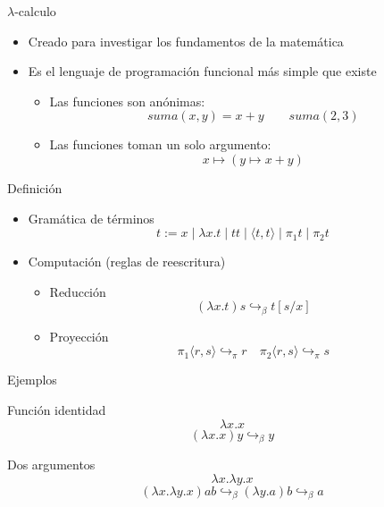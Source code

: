 \begin{frame}{$\lambda$-calculo}
	\begin{itemize}[<+->]
		\item Creado para investigar los fundamentos de la matemática
		\item Es el lenguaje de programación funcional más simple que existe
		\begin{itemize}[<+->]
			\item Las funciones son anónimas:
			\[ suma(x, y)= x + y \quad\quad suma(2, 3) \]
			\uncover<+->{
				\[ ((x, y) \mapsto x + y)(2, 3) \]
			}
			
			\item Las funciones toman un solo argumento:
			\[ x \mapsto (y \mapsto x + y) \]
			\uncover<+->{
				\[ (x \mapsto (y \mapsto x + y))\; 2 \Rightarrow y \mapsto 2 + y \]
			}
		\end{itemize}
	\end{itemize}
\end{frame}

\begin{frame}{Definición}
	\begin{itemize}[<+->]
		\item Gramática de términos
		\[ t := x \mid \lambda x.t \mid t t \mid \langle t, t \rangle \mid \pi_1 t \mid \pi_2 t \]
		
		\item Computación (reglas de reescritura)
			\begin{itemize}[<+->]
				\item Reducción
				\[ (\lambda x.t) s \hookrightarrow_\beta t[s/x] \]
				
				\item Proyección
				\[ \pi_1 \langle r, s \rangle \hookrightarrow_\pi r \quad \pi_2 \langle r, s \rangle \hookrightarrow_\pi s \]
			\end{itemize}
	\end{itemize}
	
\end{frame}

\begin{frame}{Ejemplos}
	\begin{exampleblock}{Función identidad}
		\[ \lambda x.x \]
		\[ (\lambda x.x) y \hookrightarrow_\beta y \]
	\end{exampleblock}
	\pause
	\begin{exampleblock}{Dos argumentos}
		\[ \lambda x. \lambda y.x \]
		\[ (\lambda x. \lambda y.x) a b \hookrightarrow_\beta (\lambda y.a) b \hookrightarrow_\beta a \]
	\end{exampleblock}
\end{frame}


